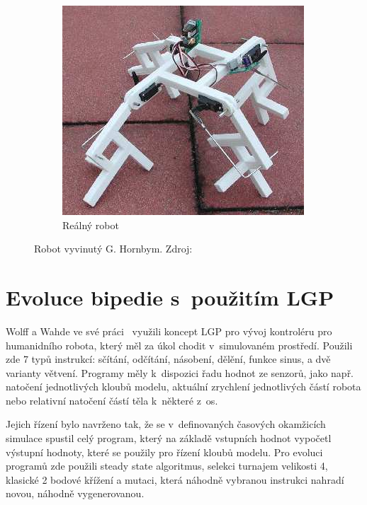 \begin{figure}
\begin{subfigure}{.33\textwidth}
        \centering
        \includegraphics[width=.9\linewidth]{obrazky/hornby_model_1_real.png}
        \caption{Reálný robot}
        \label{fig:hornby_roboti_real}
    \end{subfigure}
    \caption[Robot vyvinutý G. Hornbym]{Robot vyvinutý G. Hornbym. Zdroj:~\cite{Hornby2003}}
    \label{fig:hornby_roboti}
\end{figure}

\section{Evoluce bipedie s~použitím LGP}
\label{sec:bipedie_lgp}

Wolff a Wahde ve své práci~\cite{Wolff2007} využili koncept LGP pro vývoj kontroléru pro humanidního robota, který měl za úkol chodit v~simulovaném prostředí.
Použili zde 7 typů instrukcí: sčítání, odčítání, násobení, dělění, funkce sinus, a dvě varianty větvení.
Programy měly k~dispozici řadu hodnot ze senzorů, jako např. natočení jednotlivých kloubů modelu, aktuální zrychlení jednotlivých částí robota nebo relativní natočení částí těla k~některé z~os.

Jejich řízení bylo navrženo tak, že se v~definovaných časových okamžicích simulace spustil celý program, který na základě vstupních hodnot vypočetl výstupní hodnoty, které se použily pro řízení kloubů modelu.
Pro evoluci programů zde použili steady state algoritmus, selekci turnajem velikosti 4, klasické 2 bodové křížení a mutaci, která náhodně vybranou instrukci nahradí novou, náhodně vygenerovanou.

